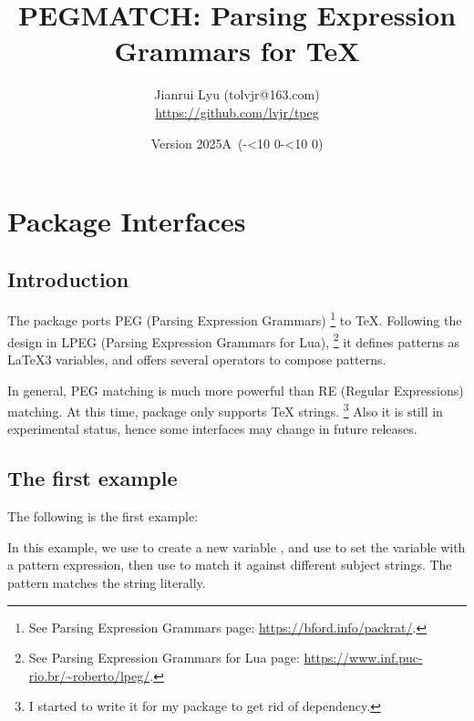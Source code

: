 \documentclass[oneside]{book}
\newcommand*{\myversion}{2025A}
\newcommand*{\mydate}{Version \myversion\ (\the\year-\mylpad\month-\mylpad\day)}
\newcommand*{\mylpad}[1]{\ifnum#1<10 0\the#1\else\the#1\fi}
\begin{document}
\title{\textsf{\color{green3}PEGMATCH: Parsing Expression Grammars for TeX}}
\author{Jianrui Lyu (tolvjr@163.com)\\ \url{https://github.com/lvjr/tpeg}}
\date{\mydate}
\maketitle

\tableofcontents

\chapter{Package Interfaces}

\section{Introduction}

The  package ports PEG (Parsing Expression Grammars)%
\footnote{See Parsing Expression Grammars page: \url{https://bford.info/packrat/}.} to TeX.
Following the design in LPEG (Parsing Expression Grammars for Lua),%
\footnote{See Parsing Expression Grammars for Lua page: \url{https://www.inf.puc-rio.br/~roberto/lpeg/}.}
it defines patterns as LaTeX3 variables, and offers several operators to compose patterns.

In general, PEG matching is much more powerful than RE (Regular Expressions) matching.
At this time,  package only supports TeX strings.%
\footnote{I started to write it for my  package to get rid of  dependency.}
Also it is still in experimental status, hence some interfaces may change in future releases.

\section{The first example}

The following is the first example:
\begin{demohigh}
\NewTpeg\lMyTestTpeg
\SetTpeg{}
\IfTpegMatchTF{}
\IfTpegMatchTF{}
\IfTpegMatchTF{}
\IfTpegMatchTF{}
\end{demohigh}
In this example, we use \CC{\NewTpeg} to create a new  variable \VV{\lMyTestTpeg},
and use \CC{\SetTpeg} to set the variable with a pattern expression,
then use \CC{\IfTpegMatchTF} to match it against different subject strings.
The pattern  matches the string  literally.
\end{document}
